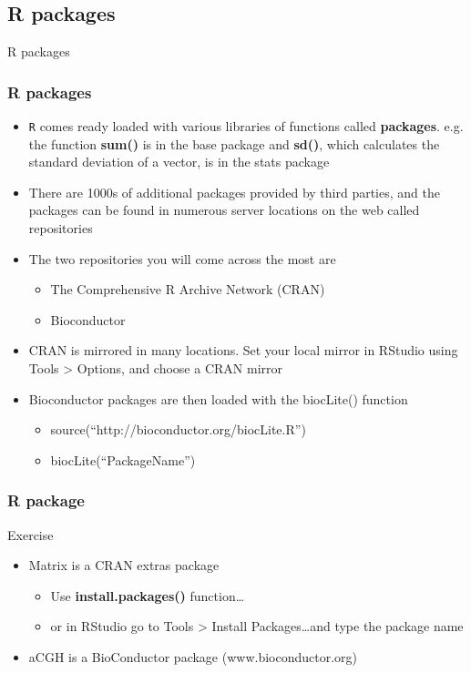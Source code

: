 \documentclass{beamer}
\begin{document}
\subsection{R packages}
\begin{frame}
	\centering \Huge R packages
\end{frame}

\begin{frame}[fragile]
	\frametitle{R packages}
	\begin{itemize}
	\small
\item \texttt{R} comes ready loaded with various libraries of functions called \textbf{packages}. e.g. the function \textbf{sum()} is in the base package and \textbf{sd()}, which calculates the standard deviation of a vector, is in the stats package
	\pause
		\item There are 1000s of additional packages provided by third parties, and the packages can be found in numerous server locations on the web called repositories
	\pause
		\item The two repositories you will come across the most are
			\begin{itemize}
				\item The Comprehensive R Archive Network (CRAN)
				\item Bioconductor
			\end{itemize}
	\pause
		\item CRAN is mirrored in many locations. Set your local mirror in RStudio using Tools > Options, and choose a CRAN mirror
	\pause
		\item Bioconductor packages are then loaded with the biocLite() function
			\begin{itemize}
				\item source(``http://bioconductor.org/biocLite.R'')
				\item biocLite(``PackageName'')
			\end{itemize}
	\end{itemize}
\end{frame}

 
\begin{frame}[fragile]
	\frametitle{R package}
	\centering \Huge Exercise
	\begin{itemize}
	\small
		\item Matrix is a CRAN extras package
			\begin{itemize}
				\item Use \textbf{install.packages()} function\ldots
				\item or in RStudio go to Tools > Install Packages\ldots and type the package name
			\end{itemize}
		\item aCGH is a BioConductor package (www.bioconductor.org)
	\end{itemize}
\end{frame}
\end{document}
